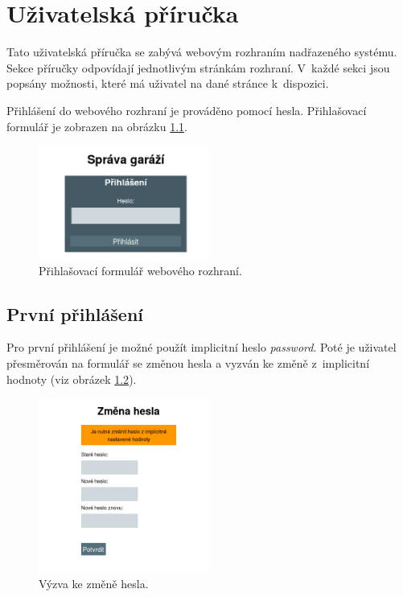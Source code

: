 \chapter{Uživatelská příručka}
\label{sec:guide}

Tato uživatelská příručka se zabývá webovým rozhraním nadřazeného systému. Sekce příručky odpovídají jednotlivým stránkám rozhraní. V~každé sekci jsou popsány možnosti, které má uživatel na dané stránce k~dispozici.

Přihlášení do webového rozhraní je prováděno pomocí hesla. Přihlašovací formulář je zobrazen na obrázku \ref{fig:login}.

\begin{figure}[h!]
    \centering
    \includegraphics[width=0.5\textwidth]{images/login.png}
    \caption[Přihlašovací formulář webového rozhraní]{Přihlašovací formulář webového rozhraní.}
    \label{fig:login}
\end{figure}

\section{První přihlášení}

Pro první přihlášení je možné použít implicitní heslo \textit{password}. Poté je uživatel přesměrován na formulář se změnou hesla a vyzván ke změně z~implicitní hodnoty (viz obrázek \ref{fig:password_change}).

\begin{figure}[h!]
    \centering
    \includegraphics[width=0.5\textwidth]{images/pwd_change.png}
    \caption[Výzva ke změně hesla]{Výzva ke změně hesla.}
    \label{fig:password_change}
\end{figure}

